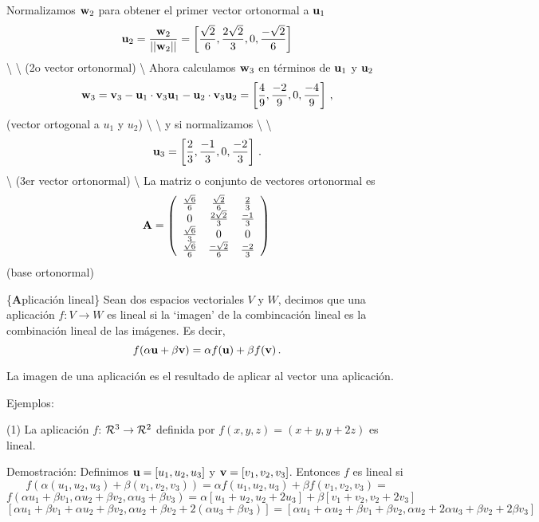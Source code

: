 \documentclass[
]{agujournal2019}
\begin{document}
Normalizamos \({\textbf w}_2\) para obtener el primer vector ortonormal
a \({\textbf u}_1\)
\[{\textbf u}_2=\frac{{\textbf w}_2}{||{\textbf w}_2||}=\left[ \frac{\sqrt{2}}{6},\frac{2\sqrt{2}}{3},0,\frac{-\sqrt{2}}{6}\right]\]
\textbackslash{} \textbackslash{} (2o vector ortonormal)
\textbackslash{} Ahora calculamos \({\textbf w}_3\) en términos de
\({\textbf u}_1\) y \({\textbf u}_2\)
\[{\textbf w}_3=  {\textbf v}_3- {\textbf u}_1\cdot{\textbf v}_3{\textbf u}_1 - {\textbf u}_2\cdot{\textbf v}_3{\textbf u}_2=
  \left[ \frac{4}{9},\frac{-2}{9},0,\frac{-4}{9}\right]\,,\] (vector
ortogonal a \(u_1\) y \(u_2\)) \textbackslash{} \textbackslash{} y si
normalizamos \textbackslash{} \textbackslash{}
\[{\textbf u}_3=\left[ \frac{2}{3},\frac{-1}{3},0,\frac{-2}{3}\right]\,.\]
\textbackslash{} (3er vector ortonormal) \textbackslash{} La matriz o
conjunto de vectores ortonormal es
\[{\textbf A}=\left(\begin{array}{cccc}
  \frac{\sqrt{6}}{6} & \frac{\sqrt{2}}{6} & \frac{2}{3}\\
  0 & \frac{2\sqrt{2}}{3} & \frac{-1}{3}\\
  \frac{\sqrt{6}}{3} & 0 & 0\\
  \frac{\sqrt{6}}{6} & \frac{-\sqrt{2}}{6} & \frac{-2}{3}\\
\end{array}
  \right)
\,\] (base ortonormal)

\vspace{0.5cm} \{\noindent \textbf Aplicación lineal\} Sean dos espacios
vectoriales \(V\) y \(W\), decimos que una aplicación
\(f:V \rightarrow W\) es lineal si la `imagen' de la combincación lineal
es la combinación lineal de las imágenes. Es decir,
\[f(\alpha {\textbf u} + \beta {\textbf v} )=\alpha f({\textbf u}) + \beta f({\textbf v})\,.\]

La imagen de una aplicación es el resultado de aplicar al vector una
aplicación.

Ejemplos:

\vspace{0.5cm} (1) La aplicación \(f\):
\({\cal R}^3 \rightarrow {\cal R}^2\) definida por
\(f(x,y,z)=(x+y,y+2z)\) es lineal.

Demostración: Definimos \({\textbf u}=[u_1,u_2,u_3]\) y
\({\textbf v}=[v_1,v_2,v_3]\). Entonces \(f\) es lineal si
\[f(\alpha (u_1,u_2,u_3) + \beta(v_1,v_2,v_3))=\alpha f(u_1,u_2,u_3) + \beta f(v_1,v_2,v_3)=\]
\[f(\alpha u_1 + \beta v_1,\alpha u_2 + \beta v_2,\alpha u_3 + \beta v_3 )=\alpha [u_1 + u_2,u_2 + 2u_3] +
\beta [v_1 + v_2,v_2 + 2v_3]\]
\[[\alpha u_1 + \beta v_1 + \alpha u_2 + \beta v_2,\alpha u_2 + \beta v_2 + 2 (\alpha u_3 + \beta v_3)]=
[\alpha u_1 + \alpha u_2 + \beta v_1 + \beta v_2, \alpha u_2 + 2\alpha u_3 + \beta v_2 + 2\beta v_3]\]
\end{document}
